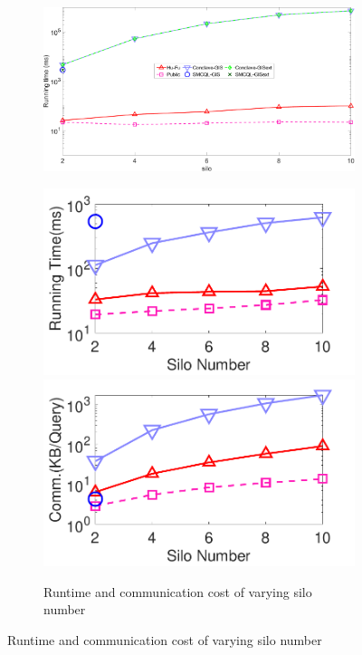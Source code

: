 \begin{figure}[t]
    \centering
    \begin{subfigure}{0.30\textwidth}
        \centering
        \includegraphics[width=\textwidth]{legend.pdf}
    \end{subfigure}
    \begin{subfigure}{0.48\textwidth}
        \centering
        \includegraphics[width=0.48\linewidth]{rangecount_silo_time.pdf}
        \includegraphics[width=0.48\linewidth]{rangecount_silo_cost.pdf}
        \caption{Runtime and communication cost of varying silo number}
        \label{fig:count-eff-r-n}
    \end{subfigure}
    

\end{figure}
